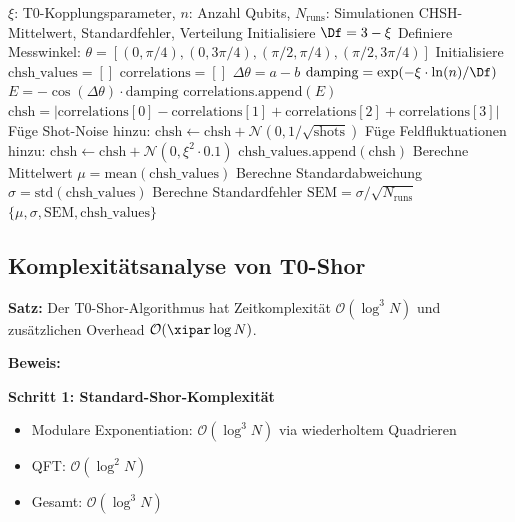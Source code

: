 \begin{algorithm}[H]
	\caption{Monte-Carlo Bell Test Simulation (Korrigierte Version)}
	\begin{algorithmic}[1]
		\REQUIRE $\xi$: T0-Kopplungsparameter, $n$: Anzahl Qubits, $N_{\text{runs}}$: Simulationen
		\ENSURE CHSH-Mittelwert, Standardfehler, Verteilung
		\STATE Initialisiere $\Df = 3 - \xi$
		\STATE Definiere Messwinkel: $\theta = [(0, \pi/4), (0, 3\pi/4), (\pi/2, \pi/4), (\pi/2, 3\pi/4)]$
		\STATE Initialisiere $\text{chsh\_values} = []$
		\STATE $\text{correlations} = []$
		\STATE $\Delta\theta = a - b$
		\STATE $\text{damping} = \exp(-\xi \cdot \ln(n) / \Df)$
		\STATE $E = -\cos(\Delta\theta) \cdot \text{damping}$ 
		\STATE $\text{correlations.append}(E)$
		\ENDFOR
		\STATE $\text{chsh} = |\text{correlations}[0] - \text{correlations}[1] + \text{correlations}[2] + \text{correlations}[3]|$
		\STATE Füge Shot-Noise hinzu: $\text{chsh} \leftarrow \text{chsh} + \mathcal{N}(0, 1/\sqrt{\text{shots}})$
		\STATE Füge Feldfluktuationen hinzu: $\text{chsh} \leftarrow \text{chsh} + \mathcal{N}(0, \xi^2 \cdot 0.1)$
		\STATE $\text{chsh\_values.append}(\text{chsh})$
		\ENDFOR
		\STATE Berechne Mittelwert $\mu = \text{mean}(\text{chsh\_values})$
		\STATE Berechne Standardabweichung $\sigma = \text{std}(\text{chsh\_values})$
		\STATE Berechne Standardfehler $\text{SEM} = \sigma / \sqrt{N_{\text{runs}}}$
		\RETURN $\{\mu, \sigma, \text{SEM}, \text{chsh\_values}\}$
	\end{algorithmic}
\end{algorithm}

\subsection{Komplexitätsanalyse von T0-Shor}
\label{app:complexity}

\textbf{Satz:} Der T0-Shor-Algorithmus hat Zeitkomplexität $\mathcal{O}(\log^3 N)$ und zusätzlichen Overhead $\mathcal{O}(\xipar \log N)$.

\textbf{Beweis:}

\textbf{Schritt 1: Standard-Shor-Komplexität}
\begin{itemize}
	\item Modulare Exponentiation: $\mathcal{O}(\log^3 N)$ via wiederholtem Quadrieren
	\item QFT: $\mathcal{O}(\log^2 N)$
	\item Gesamt: $\mathcal{O}(\log^3 N)$
\end{itemize}

